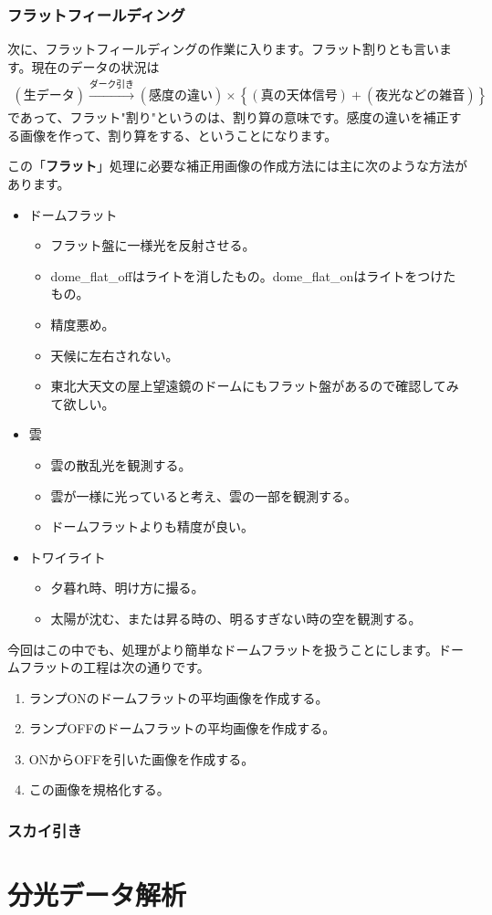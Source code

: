 \subsubsection{フラットフィールディング}
次に、フラットフィールディングの作業に入ります。フラット割りとも言います。現在のデータの状況は
\begin{align*}
  (\text{生データ}) \xrightarrow{\text{ダーク引き}} (感度の違い)\times\left\{ (真の天体信号) + (夜光などの雑音) \right\}
\end{align*}
であって、フラット"割り"というのは、割り算の意味です。感度の違いを補正する画像を作って、割り算をする、ということになります。\par
この「\textbf{フラット}」処理に必要な補正用画像の作成方法には主に次のような方法があります。
\begin{itemize}
  \item ドームフラット
  \begin{itemize}
    \item フラット盤に一様光を反射させる。
    \item dome\_flat\_offはライトを消したもの。dome\_flat\_onはライトをつけたもの。
    \item 精度悪め。
    \item 天候に左右されない。
    \item 東北大天文の屋上望遠鏡のドームにもフラット盤があるので確認してみて欲しい。
  \end{itemize}
  \item 雲
  \begin{itemize}
    \item 雲の散乱光を観測する。
    \item 雲が一様に光っていると考え、雲の一部を観測する。
    \item ドームフラットよりも精度が良い。
  \end{itemize}
  \item トワイライト
  \begin{itemize}
    \item 夕暮れ時、明け方に撮る。
    \item 太陽が沈む、または昇る時の、明るすぎない時の空を観測する。
  \end{itemize}
\end{itemize}

今回はこの中でも、処理がより簡単なドームフラットを扱うことにします。ドームフラットの工程は次の通りです。
\begin{enumerate}[(1)]
  \item ランプONのドームフラットの平均画像を作成する。
  \item ランプOFFのドームフラットの平均画像を作成する。
  \item ONからOFFを引いた画像を作成する。
  \item この画像を規格化する。
\end{enumerate}

\subsubsection{スカイ引き}


\section{分光データ解析} %
\label{sect:spec_ana}
